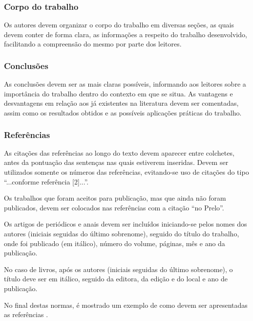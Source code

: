 \subsubsection{Corpo do trabalho} 
Os autores devem organizar o corpo do trabalho em diversas seções, as quais devem conter de forma clara, as informações a respeito do trabalho desenvolvido, facilitando a compreensão do mesmo por parte dos leitores.

\subsubsection{Conclusões} 
As conclusões devem ser as mais claras possíveis, informando aos leitores sobre a importância do trabalho dentro do contexto em que se situa. As vantagens e desvantagens em relação aos já existentes na literatura devem ser comentadas, assim como os resultados obtidos e as possíveis aplicações práticas do trabalho.

\subsubsection{Referências} 
As citações das referências ao longo do texto devem aparecer entre colchetes, antes da pontuação das sentenças nas quais estiverem inseridas. Devem ser utilizados somente os números das referências, evitando-se uso de citações do tipo ``...conforme referência [2]...''.

Os trabalhos que foram aceitos para publicação, mas que ainda não foram publicados, devem ser colocados nas referências com a citação ``no Prelo''.

Os artigos de periódicos e anais devem ser incluídos iniciando-se pelos nomes dos autores (iniciais seguidas do último sobrenome), seguido do título do trabalho, onde foi publicado (em itálico), número do volume, páginas, mês e ano da publicação. 

No caso de livros, após os autores (iniciais seguidas do último sobrenome), o título deve ser em itálico, seguido da editora, da edição e do local e ano de publicação. 

No final destas normas, é mostrado um exemplo de como devem ser apresentadas as referências \cite{angulo_active_2013,batschauer_three-phase_2012,biela_passive_2009,de_bastiani_lange_three-level_2015,dupczak_space_2012,gong_comparative_2005,heerdt_control_2014,heldwein_novel_2009,heldwein_three-phase_2011,heldwein_implementation_2010,heldwein_impact_2009,heldwein_winding_2008,heldwein_three-phase_2010,heldwein_common_2010,lago_operation_2011,nussbaumer_modeling_2008,nussbaumer_comparison_2008,nussbaumer_differential_2006,ortmann_generalized_2012,rodrigues_three-level_2009,ruiz-caballero_symmetrical_2010,silveira_ortmann_three-phase_2015,silveira_ortmann_high_2014}.


